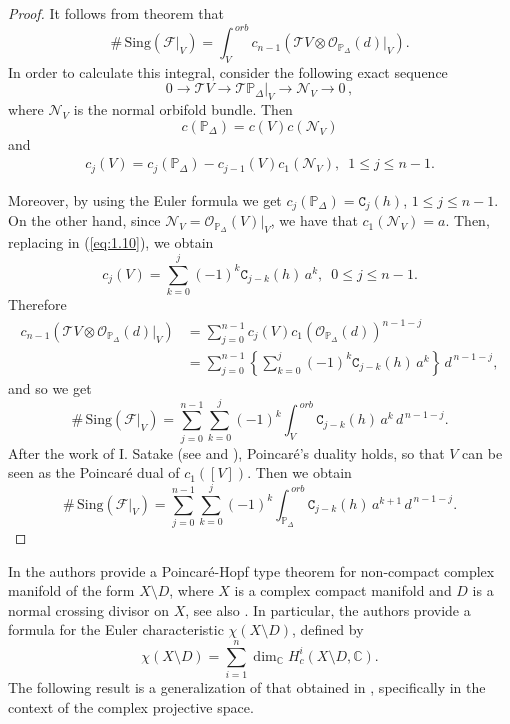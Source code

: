 \documentclass[11pt]{amsart}
\theoremstyle{plain}
\theoremstyle{definition}
\begin{document}
\begin{proof} It follows from theorem \cite[Theorem 1]{Mig} that
$$\#\,\mathrm{Sing}(\mathcal{F}|_V)=\int_{V}^{\,orb} c_{n-1}(\mathcal{T}V\otimes\mathcal{O}_{\mathbb{P}_{\Delta}}(d)|_{V}).$$
In order to calculate this integral, consider the following exact sequence
$$0 \longrightarrow \mathcal{T}V \longrightarrow \mathcal{T}\mathbb{P}_{\Delta}|_{V} \longrightarrow \mathcal{N}_{V} \longrightarrow 0\, ,$$
where $\mathcal{N}_V$ is the normal orbifold bundle. Then
$$c(\mathbb{P}_{\Delta})=c(V)c(\mathcal{N}_V)$$
and
\begin{eqnarray}\label{eq:1.10}
c_{j}(V)=c_{j}(\mathbb{P}_{\Delta})-c_{j-1}(V)c_{1}(\mathcal{N}_V),\,\,\, 1\leq j \leq n-1.
\end{eqnarray}

\vspace{0,1cm}

\noindent Moreover, by using the Euler formula we get 
$c_{j}(\mathbb{P}_{\Delta})=\texttt{C}_{j}(h)$, $1\leq j \leq n-1$.
On the other hand, since $\mathcal{N}_{V}=\mathcal{O}_{\mathbb{P}_{\Delta}}(V)|_{V}$, we have that
$c_{1}(\mathcal{N}_V)=a$. Then, replacing in (\ref{eq:1.10}), we obtain
$$c_{j}(V)=\sum_{k=0}^{j}(-1)^{k}\texttt{C}_{j-k}(h)\,a^k,\,\,\, 0 \leq j \leq n-1.$$
Therefore
\begin{align}
c_{n-1}(\mathcal{T}V\otimes\mathcal{O}_{\mathbb{P}_{\Delta}}(d)|_{V})
&=\sum_{j=0}^{n-1}c_{j}(V)c_{1}(\mathcal{O}_{\mathbb{P}_{\Delta}}(d))^{n-1-j}\nonumber\\
&=\sum_{j=0}^{n-1} \left\{\sum_{k=0}^{j}(-1)^{k}\texttt{C}_{j-k}(h)\,a^k\right\}\,d^{\,n-1-j},\nonumber
\end{align}
and so we get  
$$\#\,\mathrm{Sing}(\mathcal{F}|_V)
=\sum_{j=0}^{n-1} \sum_{k=0}^{j}(-1)^{k}\int_{V}^{\,orb}\texttt{C}_{j-k}(h)\,a^k\,d^{\,n-1-j}.$$
After the work of I. Satake (see \cite{BFK} and \cite{Sata}), Poincar\'e's duality holds, so that
$V$ can be seen as the Poincar\'e dual of $c_1 ([V])$. Then we obtain
$$\#\,\mathrm{Sing}(\mathcal{F}|_V)
=\sum_{j=0}^{n-1} \sum_{k=0}^{j}(-1)^{k}\int_{\mathbb{P}_{\Delta}}^{\,orb}\texttt{C}_{j-k}(h)\,a^{k+1}\,d^{\,n-1-j}.$$
\end{proof}

\vspace{0,1cm}

In \cite{MaDi} the authors provide a Poincar\'e-Hopf type theorem for 
non-compact complex manifold of the form $X\setminus D$, where $X$ is a complex compact
manifold and $D$ is a normal crossing divisor on $X$, see also \cite{Alu, Ii, NoKo, SiR}.
In particular, the authors provide a formula for the Euler characteristic $\chi(X\setminus D)$, defined by
$$\chi(X\setminus D)=\sum_{i=1}^n\dim_{\mathbb{C}} H^i_c(X\setminus D,\mathbb{C}).$$
The following result is a generalization of that obtained in \cite{MaDi}, specifically in the context of the complex projective space.
\end{document}
